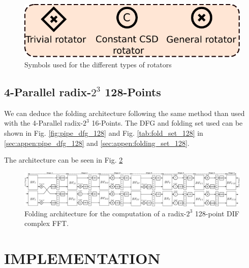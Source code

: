 \documentclass[journal,comsoc]{IEEEtran}
\begin{document}
\begin{figure}[htbp]%
\centering
 \includegraphics[width=0.6\linewidth]{Diagramas/miSeccionFiguras/Rotadores}%
\caption{Symbols used for the different types of rotators}
\label{fig:rotators}
\end{figure}

\subsection{4-Parallel radix-$2^3$ 128-Points}
We can deduce the folding architecture following the same method than used with the 4-Parallel radix-$2^3$ 16-Points. The DFG and folding set used can be shown in Fig. \ref{fig:pipe_dfg_128} and Fig. \ref{tab:fold_set_128} in \ref{sec:appen:pipe_dfg_128} and \ref{sec:appen:folding_set_128}.

The architecture can be seen in Fig. \ref{fig:circ-folding-128}

\begin{figure}[htbp]%
\centering
 \includegraphics[width=\linewidth]{Diagramas/miSeccionFiguras/4Paralelo128pRadix8}%
\caption{Folding architecture for the computation of a radix-$2^3$ 128-point DIF complex FFT.}
\label{fig:circ-folding-128}
\end{figure}


\section{IMPLEMENTATION}
\end{document}
